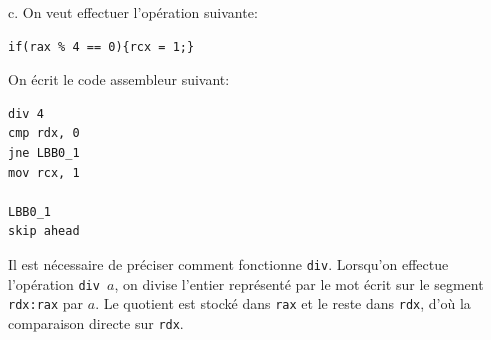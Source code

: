 \documentclass[11pt, a4 paper]{article}
\begin{document}
c. On veut effectuer l'opération suivante:
\begin{lstlisting}[style=CStyle]
if(rax % 4 == 0){rcx = 1;}
\end{lstlisting}

On écrit le code assembleur suivant:
\begin{lstlisting}[style=customasm]
div 4
cmp rdx, 0
jne LBB0_1
mov rcx, 1

LBB0_1
skip ahead
\end{lstlisting}
Il est nécessaire de préciser comment fonctionne \texttt{div}.
Lorsqu'on effectue l'opération \texttt{div $a$}, on divise l'entier représenté par le mot écrit sur le segment \texttt{rdx:rax} par $a$. Le quotient est stocké dans \texttt{rax} et le reste dans \texttt{rdx}, d'où la comparaison directe sur \texttt{rdx}.
\end{document}
